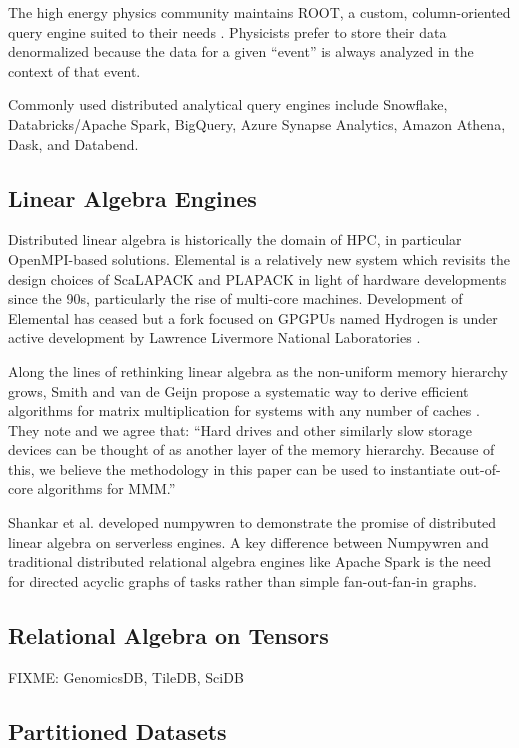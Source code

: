 \documentclass[10pt,a4paper%
]{article}
\begin{document}
The high energy physics community maintains ROOT, a custom, column-oriented query engine suited to
their needs \cite{root}. Physicists prefer to store their data denormalized because the data for a
given ``event'' is always analyzed in the context of that event.

Commonly used distributed analytical query engines include Snowflake, Databricks/Apache Spark,
BigQuery, Azure Synapse Analytics, Amazon Athena, Dask, and Databend.

\subsection{Linear Algebra Engines}

Distributed linear algebra is historically the domain of HPC, in particular OpenMPI-based
solutions. Elemental \cite{elemental} is a relatively new system which revisits the design choices
of ScaLAPACK and PLAPACK in light of hardware developments since the 90s, particularly the rise of
multi-core machines. Development of Elemental has ceased but a fork focused on GPGPUs named Hydrogen
is under active development by Lawrence Livermore National Laboratories \cite{hydrogen}.

Along the lines of rethinking linear algebra as the non-uniform memory hierarchy grows, Smith and
van de Geijn propose a systematic way to derive efficient algorithms for matrix multiplication for
systems with any number of caches \cite{momms}. They note and we agree that: ``Hard drives and other
similarly slow storage devices can be thought of as another layer of the memory hierarchy. Because
of this, we believe the methodology in this paper can be used to instantiate out-of-core algorithms
for MMM.''

Shankar et al. developed numpywren to demonstrate the promise of distributed linear algebra on
serverless engines. A key difference between Numpywren and traditional distributed relational
algebra engines like Apache Spark is the need for directed acyclic graphs of tasks rather than
simple fan-out-fan-in graphs.

\subsection{Relational Algebra on Tensors}

FIXME: GenomicsDB, TileDB, SciDB

\subsection{Partitioned Datasets}
\end{document}
